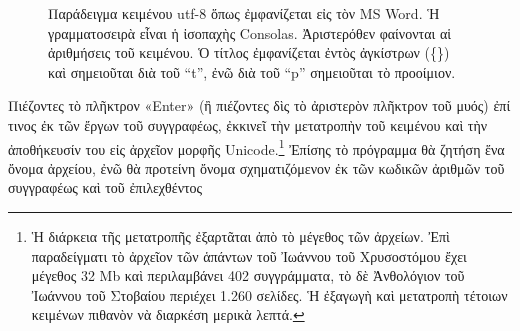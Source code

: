 \documentclass[12pt,a4paper]{article}
\begin{document}
              \begin{figure}[htb]
                \begin{center}
                    \caption{Παράδειγμα κειμένου utf-8 ὅπως ἐμφανίζεται
                           εἰς τὸν MS Word. Ἡ γραμματοσειρὰ εἶναι
                           ἡ ἰσοπαχὴς Consolas.
                           Ἀριστερόθεν φαίνονται
                           αἱ ἀριθμήσεις τοῦ κειμένου. Ὁ τίτλος
                           ἐμφανίζεται ἐντὸς ἀγκίστρων (\{\}) καὶ
                           σημειοῦται διὰ τοῦ  ``t'', ἐνῶ διὰ τοῦ ``p''
                           σημειοῦται τὸ προοίμιον.}
                \end{center}
              \end{figure}
    Πιέζοντες τὸ πλῆκτρον «Enter» (ἢ πιέζοντες δὶς τὸ
    ἀριστερὸν πλῆκτρον τοῦ μυός) ἐπί τινος ἐκ τῶν ἔργων τοῦ συγγραφέως,
    ἐκκινεῖ τὴν μετατροπὴν τοῦ κειμένου καὶ τὴν ἀποθήκευσίν του
    εἰς ἀρχεῖον μορφῆς Unicode.\footnote{Ἡ διάρκεια τῆς μετατροπῆς
                      ἐξαρτᾶται ἀπὸ τὸ μέγεθος τῶν ἀρχείων.
                      Ἐπὶ παραδείγματι τὸ ἀρχεῖον τῶν ἁπάντων
                      τοῦ Ἰωάννου τοῦ Χρυσοστόμου ἔχει μέγεθος
                      32 Mb καὶ περιλαμβάνει 402 συγγράμματα,
                      τὸ δὲ Ἀνθολόγιον τοῦ Ἰωάννου τοῦ Στοβαίου
                      περιέχει 1.260 σελίδες. Ἡ ἐξαγωγὴ καὶ
                      μετατροπὴ τέτοιων κειμένων πιθανὸν νὰ διαρκέση
                      μερικὰ λεπτά.}
    Ἐπίσης τὸ πρόγραμμα θὰ ζητήση ἕνα ὄνομα ἀρχείου, ἐνῶ θὰ προτείνη ὄνομα
    σχηματιζόμενον ἐκ τῶν κωδικῶν ἀριθμῶν τοῦ συγγραφέως καὶ τοῦ ἐπιλεχθέντος
\end{document}

